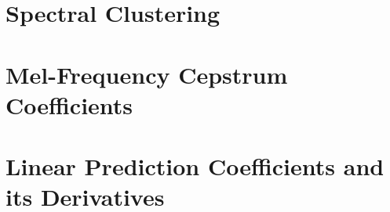 \begin{appendices}
\section{Spectral Clustering}
\label{app:spectralclustering}
\section{Mel-Frequency Cepstrum Coefficients}
\section{Linear Prediction Coefficients and its Derivatives}

\end{appendices}
